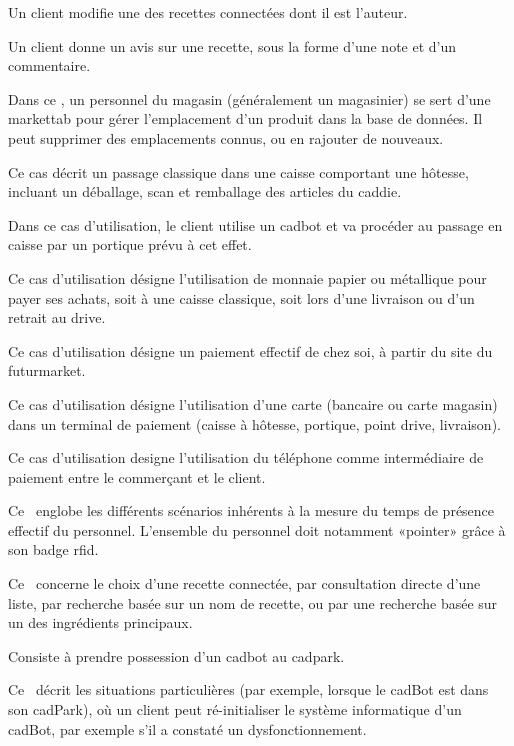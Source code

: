 Un client modifie une des recettes connectées dont il est l'auteur.

Un client donne un avis sur une recette, sous la forme d'une note et d'un commentaire.

Dans ce \cu, un personnel du magasin (généralement un magasinier) se sert d'une markettab pour gérer l'emplacement d'un produit dans la base de données.
Il peut supprimer des emplacements connus, ou en rajouter de nouveaux.

Ce cas décrit un passage classique dans une caisse comportant une hôtesse, incluant un déballage, scan et remballage des articles du caddie.

Dans ce cas d'utilisation, le client utilise un cadbot et va procéder au passage en caisse par un portique prévu à cet effet. 

Ce cas d'utilisation désigne l'utilisation de monnaie papier ou métallique pour payer ses achats, soit à une caisse classique, soit lors d'une livraison ou d'un retrait au drive.

Ce cas d'utilisation désigne un paiement effectif de chez soi, à partir du site du futurmarket.

Ce cas d'utilisation désigne l'utilisation d'une carte (bancaire ou carte magasin) dans un terminal de paiement (caisse à hôtesse, portique, point drive, livraison).

Ce cas d'utilisation designe l'utilisation du téléphone comme intermédiaire de paiement entre le commerçant et le client. 

Ce \cu\ englobe les différents scénarios inhérents à la mesure du temps de présence effectif du personnel.
L'ensemble du personnel doit notamment «pointer» grâce à son badge rfid.

Ce \cu\ concerne le choix d'une recette connectée, par consultation directe d'une liste, par recherche basée sur un nom de recette, ou par une recherche basée sur un des ingrédients principaux.

Consiste à prendre possession d'un cadbot au cadpark.

Ce \cu\ décrit les situations particulières (par exemple, lorsque le cadBot est dans son cadPark), où un client peut ré-initialiser le système informatique d'un cadBot, par exemple s'il a constaté un dysfonctionnement.


